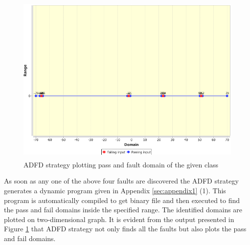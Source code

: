 \begin{figure}[H]
\centering
\includegraphics[width=12.2cm,height=8.5cm]{chapter5/pointDomainOneArgument.png}
\caption{ADFD strategy plotting pass and fault domain of the given class}
\label{fig:ADFD-example}
\end{figure}

As soon as any one of the above four faults are discovered the ADFD strategy generates a dynamic program given in Appendix \ref{sec:appendix1} (1). This program is automatically compiled to get binary file and then executed to find the pass and fail domains inside the specified range. The identified domains are plotted on two-dimensional graph. It is evident from the output presented in Figure \ref{fig:ADFD-example} that ADFD strategy not only finds all the faults but also plots the pass and fail domains.


